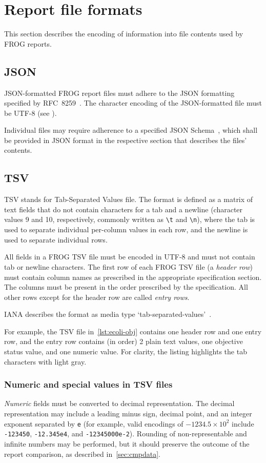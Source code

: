 \section{Report file formats}

This section describes the encoding of information into file contents used by FROG reports.

\subsection{JSON}
\label{sec:json}

JSON-formatted FROG report files must adhere to the JSON formatting specified by RFC~8259~\cite{rfc8259}.
The character encoding of the JSON-formatted file must be UTF-8 (see \cite[][section 8.1]{rfc8259}).

Individual files may require adherence to a specified JSON Schema~\cite{pezoa2016jsonschema}, which shall be provided in JSON format in the respective section that describes the files' contents.

\subsection{TSV}
\label{sec:tsv}

TSV stands for Tab-Separated Values file. The format is defined as a matrix of text fields that do not contain characters for a tab and a newline (character values 9 and 10, respectively, commonly written as \verb|\t| and \verb|\n|), where the tab is used to separate individual per-column values in each row, and the newline is used to separate individual rows.

All fields in a FROG TSV file must be encoded in UTF-8 and must not contain tab or newline characters.
The first row of each FROG TSV file (a \emph{header row}) must contain column names as prescribed in the appropriate specification section. The columns must be present in the order prescribed by the specification.
All other rows except for the header row are called \emph{entry rows}.

IANA describes the format as media type `tab-separated-values'~\cite{ianatsv}.

For example, the TSV file in~\cref{lst:ecoli-obj} contains one header row and one entry row, and the entry row contains (in order) 2 plain text values, one objective status value, and one numeric value.
For clarity, the listing highlights the tab characters with light gray.

\subsubsection{Numeric and special values in TSV files}
\emph{Numeric} fields must be converted to decimal representation. The decimal representation may include a leading minus sign, decimal point, and an integer exponent separated by \verb|e| (for example, valid encodings of $-1234.5\times10^2$ include \verb|-123450|, \verb|-12.345e4|, and \verb|-12345000e-2|). Rounding of non-representable and infinite numbers may be performed, but it should preserve the outcome of the report comparison, as described in~\cref{sec:cmpdata}.

